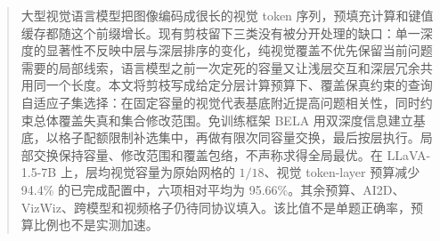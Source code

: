 \begin{abstract}
大型视觉语言模型把图像编码成很长的视觉 token 序列，预填充计算和键值缓存都随这个前缀增长。现有剪枝留下三类没有被分开处理的缺口：单一深度的显著性不反映中层与深层排序的变化，纯视觉覆盖不优先保留当前问题需要的局部线索，语言模型之前一次定死的容量又让浅层交互和深层冗余共用同一个长度。本文将剪枝写成给定分层计算预算下、覆盖保真约束的查询自适应子集选择：在固定容量的视觉代表基底附近提高问题相关性，同时约束总体覆盖失真和集合修改范围。免训练框架 BELA 用双深度信息建立基底，以格子配额限制补选集中，再做有限次同容量交换，最后按层执行。局部交换保持容量、修改范围和覆盖包络，不声称求得全局最优。在 LLaVA-1.5-7B 上，层均视觉容量为原始网格的 $1/18$、视觉 token-layer 预算减少 94.4\% 的已完成配置中，六项相对平均为 95.66\%。其余预算、AI2D、VizWiz、跨模型和视频格子仍待同协议填入。该比值不是单题正确率，预算比例也不是实测加速。
\end{abstract}
